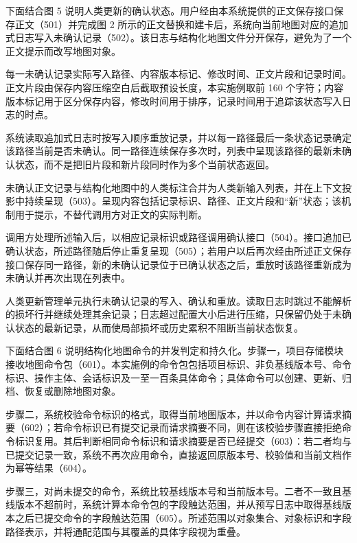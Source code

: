  下面结合图 5 说明人类更新的确认状态。用户经由本系统提供的正文保存接口保存正文（501）并完成图 2 所示的正文替换和建卡后，系统向当前地图对应的追加式日志写入未确认记录（502）。该日志与结构化地图文件分开保存，避免为了一个正文提示而改写地图对象。

 每一未确认记录实际写入路径、内容版本标记、修改时间、正文片段和记录时间。正文片段由保存内容压缩空白后截取预设长度，本实施例取前 160 个字符；内容版本标记用于区分保存内容，修改时间用于排序，记录时间用于追踪该状态写入日志的时点。

 系统读取追加式日志时按写入顺序重放记录，并以每一路径最后一条状态记录确定该路径当前是否未确认。同一路径连续保存多次时，列表中呈现该路径的最新未确认状态，而不是把旧片段和新片段同时作为多个当前状态返回。

 未确认正文记录与结构化地图中的人类标注合并为人类新输入列表，并在上下文投影中持续呈现（503）。呈现内容包括记录标识、路径、正文片段和“新”状态；该机制用于提示，不替代调用方对正文的实际判断。

 调用方处理所述输入后，以相应记录标识或路径调用确认接口（504）。接口追加已确认状态，所述路径随后停止重复呈现（505）；若用户以后再次经由所述正文保存接口保存同一路径，新的未确认记录位于已确认状态之后，重放时该路径重新成为未确认并再次出现在列表中。

 人类更新管理单元执行未确认记录的写入、确认和重放。读取日志时跳过不能解析的损坏行并继续处理其余记录；日志超过配置大小后进行压缩，只保留仍处于未确认状态的最新记录，从而使局部损坏或历史累积不阻断当前状态恢复。

 下面结合图 6 说明结构化地图命令的并发判定和持久化。步骤一，项目存储模块接收地图命令包（601）。本实施例的命令包包括项目标识、非负基线版本号、命令标识、操作主体、会话标识及一至一百条具体命令；具体命令可以创建、更新、归档、恢复或删除地图对象。

 步骤二，系统校验命令标识的格式，取得当前地图版本，并以命令内容计算请求摘要（602）；若命令标识已有提交记录而请求摘要不同，则在该校验步骤直接拒绝命令标识复用。其后判断相同命令标识和请求摘要是否已经提交（603）：若二者均与已提交记录一致，系统不再次应用命令，直接返回原版本号、校验值和当前文档作为幂等结果（604）。

 步骤三，对尚未提交的命令，系统比较基线版本号和当前版本号。二者不一致且基线版本不超前时，系统计算本命令包的字段触达范围，并从预写日志中取得基线版本之后已提交命令的字段触达范围（605）。所述范围以对象集合、对象标识和字段路径表示，并将通配范围与其覆盖的具体字段视为重叠。

